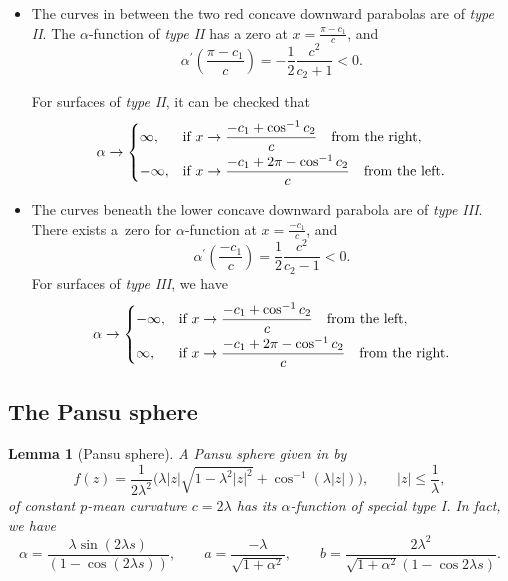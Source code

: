 \documentclass[10pt,a4paper]{amsart}
\numberwithin{equation}{section}
\newtheorem{Lemma}[Theorem]{Lemma}
\begin{document}
\begin{itemize}
\item The curves in between the two red concave downward parabolas are
of \emph{type II}. The $\alpha$-function of \emph{type II} has a zero at
$x=\frac{\pi-c_1}{c}$, and
\[
\alpha^{\prime }\left(\frac{\pi-c_1}{c}\right)=-\frac{1}{2}\frac{c^2}{c_{2}+1}<0.
\]

For surfaces of \emph{type II}, it can be checked that
\begin{equation*}
\alpha \rightarrow \begin{cases}
\infty, & \text{if}\ x\rightarrow \dfrac{-c_{1}+\cos^{-1}c_2}{c}\quad \text{from the right}, \vspace{1mm}\\
-\infty, & \text{if}\ x\rightarrow \dfrac{-c_{1}+2\pi-\cos^{-1}c_2}{c}\quad
\text{from the left}.
\end{cases}
\end{equation*}

\item The curves beneath the lower concave downward parabola are of \emph{type III}. There exists a~zero for $\alpha$-function at $x=\frac{-c_{1}}{c}$, and
\[
\alpha^{\prime }\left(\frac{-c_1}{c}\right)=\frac{1}{2}\frac{c^2}{c_{2}-1}<0.
\]
For surfaces of \emph{type III}, we have
\begin{equation*}
\alpha \rightarrow\begin{cases}
-\infty, & \text{if}\ x\rightarrow \dfrac{-c_{1}+\cos^{-1}c_2}{c}\quad \text{from the left}, \vspace{1mm}\\
\infty, & \text{if}\ x\rightarrow \dfrac{-c_{1}+2\pi-\cos^{-1}c_2}{c}\quad
\text{from the right}.
\end{cases}
\end{equation*}
\end{itemize}

\subsection{The Pansu sphere}\label{pansu1}

\begin{Lemma}[Pansu sphere]
A Pansu sphere given in {\rm\cite{ChengJ/ChiuH/HwangJ/YangP:2018}} by
\begin{equation}\label{pansusphere}
f(z)=\frac{1}{2\lambda^2}\bigl(\lambda|z|\sqrt{1-\lambda^2|z|^2}+\cos^{-1}(\lambda|z|)\bigr),\qquad |z|\leq \frac{1}{\lambda},
\end{equation}
of constant $p$-mean curvature $c=2\lambda$ has its $\alpha$-function of special type I. In fact, we have
\begin{equation*}
\alpha=\frac{\lambda \sin(2\lambda s)}{(1-\cos(2\lambda s))},\qquad a=\frac{-\lambda}{\sqrt{1+\alpha^2}},\qquad b=\frac{2\lambda^{2}}{\sqrt{1+\alpha^2}(1-\cos{2\lambda s})}.
\end{equation*}
\end{Lemma}
\end{document}

